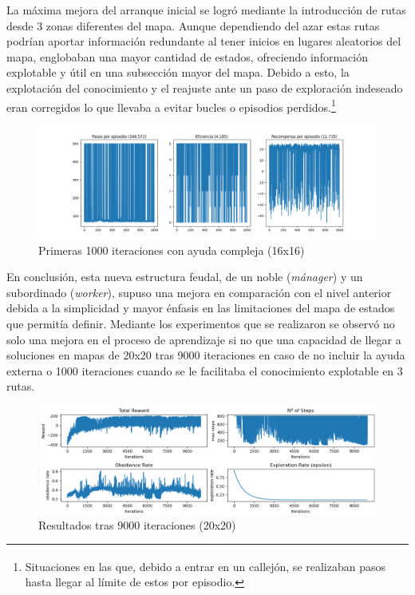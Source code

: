 \documentclass[letterpaper]{article} %
\begin{document}
La máxima mejora del arranque inicial se logró mediante la introducción de rutas desde 3 zonas diferentes del mapa. Aunque dependiendo del azar estas
 rutas podrían aportar información redundante al tener inicios en lugares aleatorios del mapa, englobaban una mayor cantidad de estados, ofreciendo
  información explotable y útil en una subsección mayor del mapa. Debido a esto, la explotación del conocimiento y el reajuste ante un paso de 
  exploración indeseado eran corregidos lo que llevaba a evitar bucles o episodios perdidos.\footnote{\textsuperscript{}Situaciones en las que, 
  debido a entrar en un callejón, se realizaban pasos hasta llegar al límite de estos por episodio.}

\begin{figure}[H]
    \centering
    \includegraphics[width=0.9\columnwidth]{ayuda_externa_3paths.png}
    \caption{Primeras 1000 iteraciones con ayuda compleja (16x16)\label{fig:FuN3}}
\end{figure}

En conclusión, esta nueva estructura feudal, de un noble (\textit{mánager}) y un subordinado (\textit{worker}), supuso una mejora en comparación con el nivel anterior debida a la simplicidad y mayor énfasis en las limitaciones del mapa de estados que permitía definir. Mediante los experimentos que se realizaron se observó no solo una mejora en el proceso de aprendizaje si no que una capacidad de llegar a soluciones en mapas de 20x20 tras 9000 iteraciones en caso de no incluir la ayuda externa o 1000 iteraciones cuando se le facilitaba el conocimiento explotable en 3 rutas. 

\begin{figure}[H]
    \centering
    \includegraphics[width=0.9\columnwidth]{QL_resumen_final.png}
    \caption{Resultados tras 9000 iteraciones (20x20)}
    \label{fig:FuN1}
\end{figure}
\end{document}
